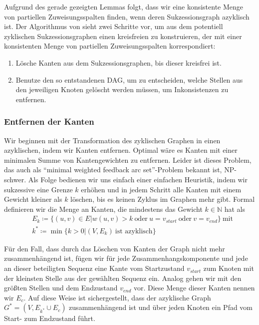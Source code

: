 Aufgrund des gerade gezeigten Lemmas folgt, dass wir eine konsistente Menge von partiellen Zuweisungsspalten finden, wenn deren Sukzessionsgraph azyklisch ist. Der Algorithmus von \cite{pdc10} sieht zwei Schritte vor, um aus dem potentiell zyklischen Sukzessionsgraphen einen kreisfreien zu konstruieren, der mit einer konsistenten Menge von partiellen Zuweisungsspalten korrespondiert:

\begin{enumerate}[topsep=0pt,itemsep=-1ex,partopsep=1ex,parsep=1ex]
	\item Lösche Kanten aus dem Sukzessionsgraphen, bis dieser kreisfrei ist.
	\item Benutze den so entstandenen DAG, um zu entscheiden, welche Stellen aus den jeweiligen Knoten gelöscht werden müssen, um Inkonsistenzen zu entfernen.
\end{enumerate}

\subsubsection{Entfernen der Kanten}

Wir beginnen mit der Transformation des zyklischen Graphen in einen azyklischen, indem wir Kanten entfernen. Optimal wäre es Kanten mit einer minimalen Summe von Kantengewichten zu entfernen. Leider ist dieses Problem, das auch als \enquote{minimal weighted feedback arc set}-Problem bekannt ist, NP-schwer. Als Folge bedienen wir uns einfach einer einfachen Heuristik, indem wir sukzessive eine Grenze $k$ erhöhen und in jedem Schritt alle Kanten mit einem Gewicht kleiner als $k$ löschen, bis es keinen Zyklus im Graphen mehr gibt. Formal definieren wir die Menge an Kanten, die mindestens das Gewicht $k\in \mathbb{N}$ hat als 
\begin{equation}
\begin{split}
	& E_k \coloneqq \{(u,v)\in E | w(u,v) > k\: \text{oder}\: u = v_{start}\: \text{oder}\: v = v_{end}\}\: \text{mit} \\
	& k^* \coloneqq \min\{k > 0 | (V,E_k)\: \text{ist azyklisch}\}
\end{split}
\end{equation}

Für den Fall, dass durch das Löschen von Kanten der Graph nicht mehr zusammenhängend ist, fügen wir für jede Zusammenhangskomponente und jede an dieser beteiligten Sequenz eine Kante vom Startzustand $v_{start}$ zum Knoten mit der kleinsten Stelle aus der gewählten Sequenz ein. Analog gehen wir mit den größten Stellen und dem Endzustand $v_{end}$ vor. Diese Menge dieser Kanten nennen wir $E_c$. Auf diese Weise ist sichergestellt, dass der azyklische Graph $G^* = (V,E_{k^*}\cup E_c)$ zusammenhängend ist und über jeden Knoten ein Pfad vom Start- zum Endzustand führt.

